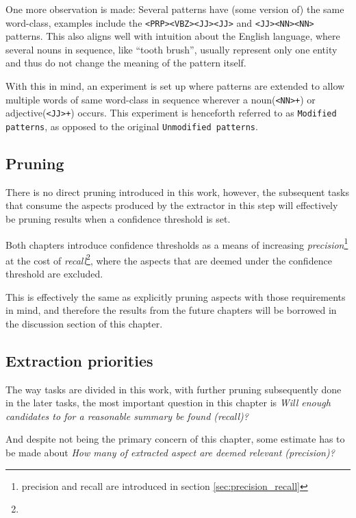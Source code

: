\documentclass[a4paper,11pt]{kth-mag}
\begin{document}
One more observation is made: Several patterns have (some version of) the same word-class,
examples include the \texttt{<PRP><VBZ><JJ><JJ>} and \texttt{<JJ><NN><NN>} patterns.
This also aligns well with intuition about the English language, where several nouns in sequence,
like ``tooth brush'', usually represent only one entity and thus do not change
the meaning of the pattern itself.

With this in mind, an experiment is set up where patterns are extended to allow
multiple words of same word-class in sequence wherever a noun(\texttt{<NN>+})
or adjective(\texttt{<JJ>+}) occurs.
This experiment is henceforth referred to as \texttt{Modified patterns}, as opposed to
the original \texttt{Unmodified patterns}.


\subsection{Pruning}
\label{subsec:pruning}
There is no direct pruning introduced in this work, however, the subsequent tasks that consume
the aspects produced by the extractor in this step will effectively be pruning results when
a confidence threshold is set.

Both chapters introduce confidence thresholds as a means of increasing
\emph{precision}\footnote{precision and recall are introduced in section \ref{sec:precision_recall}}
at the cost of \emph{recall}\footnote{},
where the aspects that are deemed under the confidence threshold are excluded.

This is effectively the same as explicitly pruning aspects with those requirements in mind, and therefore
the results from the future chapters will be borrowed in the discussion section of this chapter.


\subsection{Extraction priorities}
The way tasks are divided in this work, with further pruning subsequently done in
the later tasks, the most important question in this chapter is
\emph{Will enough candidates to for a reasonable summary be found (recall)?}

And despite not being the primary concern of this chapter, some estimate has to be made about
\emph{How many of extracted aspect are deemed relevant (precision)?}

%
\end{document}
